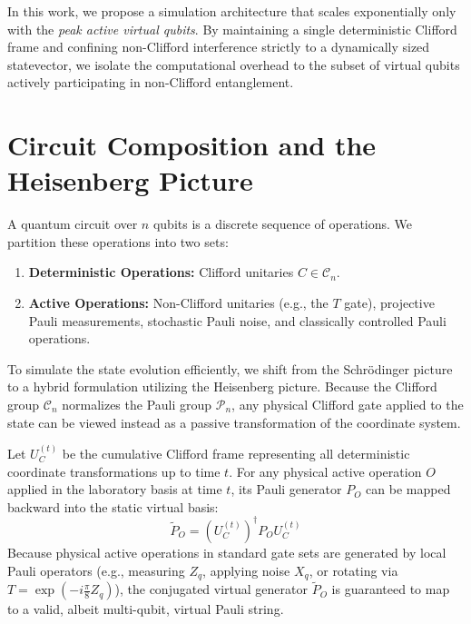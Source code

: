 \documentclass[11pt]{article}
\begin{document}
In this work, we propose a simulation architecture that scales exponentially only with the \textit{peak active virtual qubits}. By maintaining a single deterministic Clifford frame and confining non-Clifford interference strictly to a dynamically sized statevector, we isolate the computational overhead to the subset of virtual qubits actively participating in non-Clifford entanglement.

\section{Circuit Composition and the Heisenberg Picture}
\label{sec:heisenberg}

A quantum circuit over $n$ qubits is a discrete sequence of operations. We partition these operations into two sets:
\begin{enumerate}
    \item \textbf{Deterministic Operations:} Clifford unitaries $C \in \mathcal{C}_n$.
    \item \textbf{Active Operations:} Non-Clifford unitaries (e.g., the $T$ gate), projective Pauli measurements, stochastic Pauli noise, and classically controlled Pauli operations.
\end{enumerate}

To simulate the state evolution efficiently, we shift from the Schrödinger picture to a hybrid formulation utilizing the Heisenberg picture. Because the Clifford group $\mathcal{C}_n$ normalizes the Pauli group $\mathcal{P}_n$, any physical Clifford gate applied to the state can be viewed instead as a passive transformation of the coordinate system.

Let $U_C^{(t)}$ be the cumulative Clifford frame representing all deterministic coordinate transformations up to time $t$. For any physical active operation $O$ applied in the laboratory basis at time $t$, its Pauli generator $P_O$ can be mapped backward into the static virtual basis:
\begin{equation} \label{eq:heisenberg_map}
    \tilde{P}_O = (U_C^{(t)})^\dagger P_O U_C^{(t)}
\end{equation}
Because physical active operations in standard gate sets are generated by local Pauli operators (e.g., measuring $Z_q$, applying noise $X_q$, or rotating via $T = \exp(-i \frac{\pi}{8} Z_q)$), the conjugated virtual generator $\tilde{P}_O$ is guaranteed to map to a valid, albeit multi-qubit, virtual Pauli string.
\end{document}
